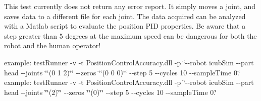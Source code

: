 This test currently does not return any error report. It simply moves a joint, and saves data to a different file for each joint. The data acquired can be analyzed with a Matlab script to evaluate the position P\+ID properties. Be aware that a step greater than 5 degrees at the maximum speed can be dangerous for both the robot and the human operator!

example\+: test\+Runner -\/v -\/t Position\+Control\+Accuracy.\+dll -\/p \char`\"{}-\/-\/robot icub\+Sim -\/-\/part head -\/-\/joints \char`\"{}\char`\"{}(0 1 2)\char`\"{}\char`\"{} -\/-\/zeros \char`\"{}\char`\"{}(0 0 0)\char`\"{}\char`\"{}  -\/-\/step 5  -\/-\/cycles 10 -\/-\/sample\+Time 0.\char`\"{} example\+: test\+Runner -\/v -\/t Position\+Control\+Accuracy.\+dll -\/p \char`\"{}-\/-\/robot icub\+Sim -\/-\/part head -\/-\/joints \char`\"{}\char`\"{}(2)\char`\"{}\char`\"{} -\/-\/zeros \char`\"{}\char`\"{}(0)\char`\"{}\char`\"{} -\/-\/step 5 -\/-\/cycles 10 -\/-\/sample\+Time 0.\char`\"{}

